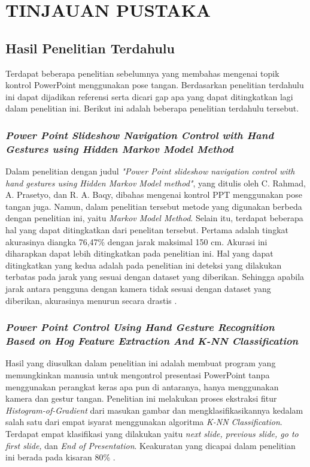 \chapter{TINJAUAN PUSTAKA}
\label{chap:tinjauanpustaka}

\section{Hasil Penelitian Terdahulu}
\label{sec:hasilpenelitianterdahulu}
Terdapat beberapa penelitian sebelumnya yang membahas mengenai topik kontrol PowerPoint menggunakan pose tangan. Berdasarkan penelitian terdahulu ini dapat dijadikan referensi serta dicari gap apa yang dapat ditingkatkan lagi dalam penelitian ini. Berikut ini adalah beberapa penelitian terdahulu tersebut.
\subsection{\emph{Power Point Slideshow Navigation Control with Hand Gestures using Hidden Markov Model Method}}
\label{subsec:Power Point slideshow navigation control with hand gestures using Hidden Markov Model method}
Dalam penelitian dengan judul \emph{"Power Point slideshow navigation control with hand gestures using Hidden Markov Model method"}, yang ditulis oleh C. Rahmad, A. Prasetyo, dan R. A. Baqy, dibahas mengenai kontrol PPT menggunakan pose tangan juga. Namun, dalam penelitian tersebut metode yang digunakan berbeda dengan penelitian ini, yaitu \emph{Markov Model Method}. Selain itu, terdapat beberapa hal yang dapat ditingkatkan dari penelitan tersebut. Pertama adalah tingkat akurasinya diangka 76,47\% dengan jarak maksimal 150 cm. Akurasi ini diharapkan dapat lebih ditingkatkan pada penelitian ini. Hal yang dapat ditingkatkan yang kedua adalah pada penelitian ini deteksi yang dilakukan terbatas pada jarak yang sesuai dengan dataset yang diberikan. Sehingga apabila jarak antara pengguna dengan kamera tidak sesuai dengan dataset yang diberikan, akurasinya menurun secara drastis \parencite{Rahmad2022}.

\subsection{\emph{Power Point Control Using Hand Gesture
Recognition Based on Hog Feature Extraction And
K-NN Classification}}
\label{subsec:Power Point Control Using Hand Gesture
Recognition Based on Hog Feature Extraction And
K-NN Classification}
Hasil yang diusulkan dalam penelitian ini adalah membuat program yang memungkinkan manusia untuk mengontrol presentasi PowerPoint tanpa menggunakan perangkat keras apa pun di antaranya, hanya menggunakan kamera dan gestur tangan. Penelitian ini melakukan proses ekstraksi fitur \emph{Histogram-of-Gradient} dari masukan gambar dan mengklasifikasikannya kedalam salah satu dari empat
isyarat menggunakan algoritma \emph{K-NN Classification}. Terdapat empat klasifikasi yang dilakukan yaitu \emph{next slide, previous slide, go to first slide,} dan \emph{End of Presentation}. Keakuratan yang dicapai dalam penelitian ini berada pada kisaran 80\% \parencite{Tejashree2017}. 

